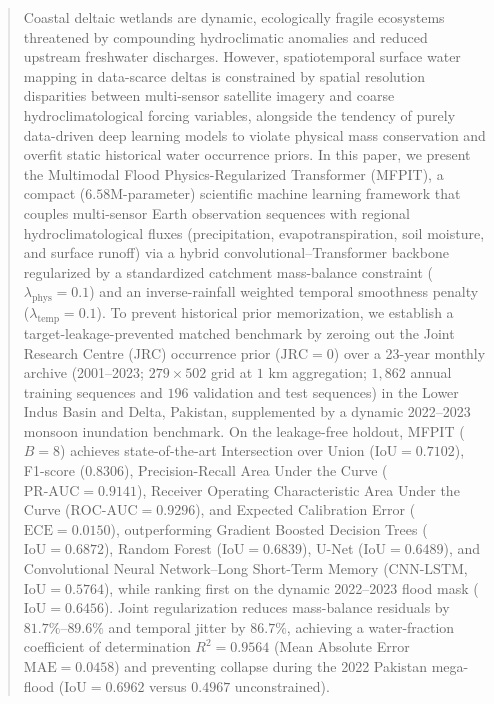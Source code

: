 \documentclass[journal]{IEEEtran}
\begin{document}
\begin{abstract}
Coastal deltaic wetlands are dynamic, ecologically fragile ecosystems threatened by compounding hydroclimatic anomalies and reduced upstream freshwater discharges. However, spatiotemporal surface water mapping in data-scarce deltas is constrained by spatial resolution disparities between multi-sensor satellite imagery and coarse hydroclimatological forcing variables, alongside the tendency of purely data-driven deep learning models to violate physical mass conservation and overfit static historical water occurrence priors. In this paper, we present the Multimodal Flood Physics-Regularized Transformer (MFPIT), a compact ($6.58\text{M}$-parameter) scientific machine learning framework that couples multi-sensor Earth observation sequences with regional hydroclimatological fluxes (precipitation, evapotranspiration, soil moisture, and surface runoff) via a hybrid convolutional--Transformer backbone regularized by a standardized catchment mass-balance constraint ($\lambda_{\text{phys}} = 0.1$) and an inverse-rainfall weighted temporal smoothness penalty ($\lambda_{\text{temp}} = 0.1$). To prevent historical prior memorization, we establish a target-leakage-prevented matched benchmark by zeroing out the Joint Research Centre (JRC) occurrence prior ($\text{JRC} = 0$) over a 23-year monthly archive (2001--2023; $279 \times 502$ grid at $1\text{ km}$ aggregation; $1,862$ annual training sequences and $196$ validation and test sequences) in the Lower Indus Basin and Delta, Pakistan, supplemented by a dynamic 2022--2023 monsoon inundation benchmark. On the leakage-free holdout, MFPIT ($B=8$) achieves state-of-the-art Intersection over Union ($\text{IoU} = 0.7102$), F1-score ($0.8306$), Precision-Recall Area Under the Curve ($\text{PR-AUC} = 0.9141$), Receiver Operating Characteristic Area Under the Curve ($\text{ROC-AUC} = 0.9296$), and Expected Calibration Error ($\text{ECE} = 0.0150$), outperforming Gradient Boosted Decision Trees ($\text{IoU} = 0.6872$), Random Forest ($\text{IoU} = 0.6839$), U-Net ($\text{IoU} = 0.6489$), and Convolutional Neural Network--Long Short-Term Memory ($\text{CNN-LSTM}$, $\text{IoU} = 0.5764$), while ranking first on the dynamic 2022--2023 flood mask ($\text{IoU} = 0.6456$). Joint regularization reduces mass-balance residuals by $81.7\%$--$89.6\%$ and temporal jitter by $86.7\%$, achieving a water-fraction coefficient of determination $R^2 = 0.9564$ (Mean Absolute Error $\text{MAE} = 0.0458$) and preventing collapse during the 2022 Pakistan mega-flood ($\text{IoU} = 0.6962$ versus $0.4967$ unconstrained).
\end{abstract}
\end{document}
